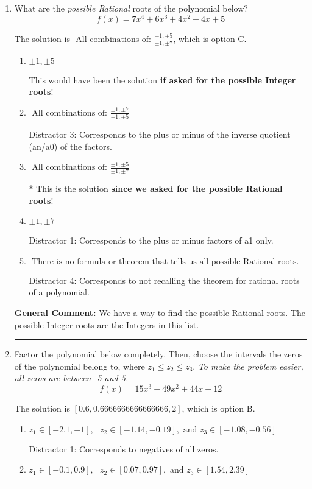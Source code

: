 \documentclass{extbook}[14pt]
\newcommand{\litem}[1]{\item #1

\rule{\textwidth}{0.4pt}}
\begin{document}
\begin{enumerate}\litem{
What are the \textit{possible Rational} roots of the polynomial below?
\[ f(x) = 7x^{4} +6 x^{3} +4 x^{2} +4 x + 5 \]

The solution is \( \text{ All combinations of: }\frac{\pm 1,\pm 5}{\pm 1,\pm 7} \), which is option C.\begin{enumerate}[label=\Alph*.]
\item \( \pm 1,\pm 5 \)

This would have been the solution \textbf{if asked for the possible Integer roots}!
\item \( \text{ All combinations of: }\frac{\pm 1,\pm 7}{\pm 1,\pm 5} \)

 Distractor 3: Corresponds to the plus or minus of the inverse quotient (an/a0) of the factors. 
\item \( \text{ All combinations of: }\frac{\pm 1,\pm 5}{\pm 1,\pm 7} \)

* This is the solution \textbf{since we asked for the possible Rational roots}!
\item \( \pm 1,\pm 7 \)

 Distractor 1: Corresponds to the plus or minus factors of a1 only.
\item \( \text{ There is no formula or theorem that tells us all possible Rational roots.} \)

 Distractor 4: Corresponds to not recalling the theorem for rational roots of a polynomial.
\end{enumerate}

\textbf{General Comment:} We have a way to find the possible Rational roots. The possible Integer roots are the Integers in this list.
}
\litem{
Factor the polynomial below completely. Then, choose the intervals the zeros of the polynomial belong to, where $z_1 \leq z_2 \leq z_3$. \textit{To make the problem easier, all zeros are between -5 and 5.}
\[ f(x) = 15x^{3} -49 x^{2} +44 x -12 \]

The solution is \( [0.6, 0.6666666666666666, 2] \), which is option B.\begin{enumerate}[label=\Alph*.]
\item \( z_1 \in [-2.1, -1], \text{   }  z_2 \in [-1.14, -0.19], \text{   and   } z_3 \in [-1.08, -0.56] \)

 Distractor 1: Corresponds to negatives of all zeros.
\item \( z_1 \in [-0.1, 0.9], \text{   }  z_2 \in [0.07, 0.97], \text{   and   } z_3 \in [1.54, 2.39] \)


\end{enumerate}}
\end{enumerate}
\end{document}

